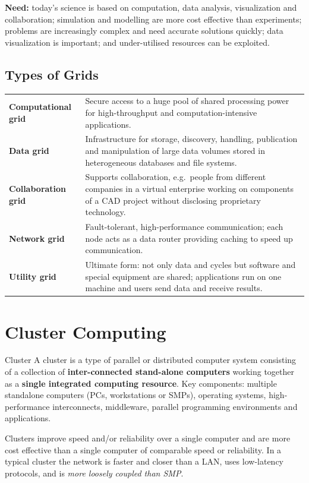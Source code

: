 \textbf{Need:} today's science is based on computation, data analysis, visualization and
collaboration; simulation and modelling are more cost effective than experiments; problems are
increasingly complex and need accurate solutions quickly; data visualization is important; and
under-utilised resources can be exploited.

\subsection{Types of Grids}
\begin{center}
\begin{tabularx}{\textwidth}{>{\bfseries}lX}
\toprule
Computational grid & Secure access to a huge pool of shared processing power for
high-throughput and computation-intensive applications.\\
Data grid & Infrastructure for storage, discovery, handling, publication and manipulation of
large data volumes stored in heterogeneous databases and file systems.\\
Collaboration grid & Supports collaboration, e.g.\ people from different companies in a virtual
enterprise working on components of a CAD project without disclosing proprietary technology.\\
Network grid & Fault-tolerant, high-performance communication; each node acts as a data router
providing caching to speed up communication.\\
Utility grid & Ultimate form: not only data and cycles but software and special equipment are
shared; applications run on one machine and users send data and receive results.\\
\bottomrule
\end{tabularx}
\end{center}

\section{Cluster Computing}
\begin{defbox}{Cluster}
A cluster is a type of parallel or distributed computer system consisting of a collection of
\textbf{inter-connected stand-alone computers} working together as a \textbf{single integrated
computing resource}. Key components: multiple standalone computers (PCs, workstations or SMPs),
operating systems, high-performance interconnects, middleware, parallel programming environments
and applications.
\end{defbox}
Clusters improve speed and/or reliability over a single computer and are more cost effective than
a single computer of comparable speed or reliability. In a typical cluster the network is faster
and closer than a LAN, uses low-latency protocols, and is \emph{more loosely coupled than SMP}.

